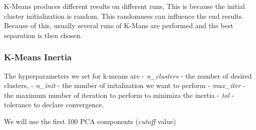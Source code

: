\documentclass[11pt]{article}
\begin{document}
K-Means produces different results on different runs, This is because
the initial cluster initialization is random. This randomness can
influence the end results. Because of this, usually several runs of
K-Mans are performed and the best separation is then chosen.

\subsubsection{K-Means Inertia}\label{k-means-inertia}

The hyperparameters we set for k-means are - \emph{n\_clusters} - the
number of desired clusters, - \emph{n\_init} - the number of
initalization we want to perform - \emph{max\_iter} - the maximum number
of iteration to perform to minimiza the inertia - \emph{tol} - tolerance
to declare convergence.

We will use the first 100 PCA components (\emph{cutoff} value)
\end{document}
